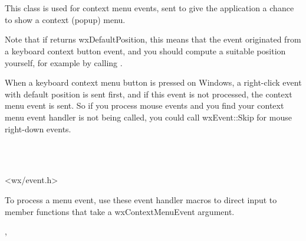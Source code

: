 \section{}\label{wxcontextmenuevent}

This class is used for context menu events, sent to give
the application a chance to show a context (popup) menu.

Note that if  returns wxDefaultPosition, this means that the event originated
from a keyboard context button event, and you should compute a suitable position yourself,
for example by calling .

When a keyboard context menu button is pressed on Windows, a right-click event with default position is sent first,
and if this event is not processed, the context menu event is sent. So if you process mouse events and you find your context menu event handler
is not being called, you could call wxEvent::Skip for mouse right-down events.


\\
\\


<wx/event.h>




To process a menu event, use these event handler macros to direct input to member
functions that take a wxContextMenuEvent argument.

\twocolwidtha{7cm}
\begin{twocollist}\itemsep=0pt
\end{twocollist}


,\\


\label{wxcontextmenueventctor}

